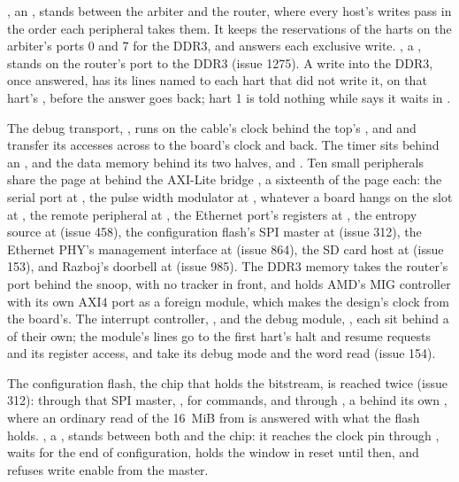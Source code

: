, an ,
stands between the arbiter and the router, where every host's writes
pass in the order each peripheral takes them. It keeps the
reservations of the harts on the arbiter's ports 0 and 7 for the DDR3,
and answers each exclusive write. , a
, stands on the router's port to the DDR3 (issue
1275). A write into the DDR3, once answered, has its lines named to
each hart that did not write it, on that hart's ,
before the answer goes back; hart 1 is told nothing while
 says it waits in .

The debug transport, , runs on the cable's
clock behind the top's , and  and
 transfer its accesses across to the board's clock and back.
The timer sits behind an , and the data memory behind
its two halves,  and . Ten
small peripherals share the page at  behind the AXI-Lite
bridge , a sixteenth of the page each: the
serial port at
, the pulse width modulator at , whatever a
board hangs on the slot at , the remote peripheral at
, the Ethernet port's registers at , the
entropy source at  (issue 458), the configuration
flash's SPI master at  (issue 312), the Ethernet PHY's
management interface at  (issue 864), the SD card host
at  (issue 153), and Razboj's doorbell at 
(issue 985). The DDR3 memory takes the router's port behind the
snoop, with no tracker in front, and holds AMD's MIG controller with its own
AXI4 port as a foreign module, which makes the design's clock from the
board's. The interrupt
controller, , and the debug module, , each sit
behind a  of their own; the module's lines go to
the first hart's halt and resume requests and its register access, and
take its debug mode and the word read (issue 154).

The configuration flash, the chip that holds the bitstream, is reached
twice (issue 312): through that SPI master, , for commands,
and through , a  behind
its own , where an ordinary read of the 16~MiB from
 is answered with what the flash holds.
, a , stands between both and the
chip: it reaches the clock pin through , waits for the
end of configuration, holds the window in reset until then, and
refuses write enable from the master.

